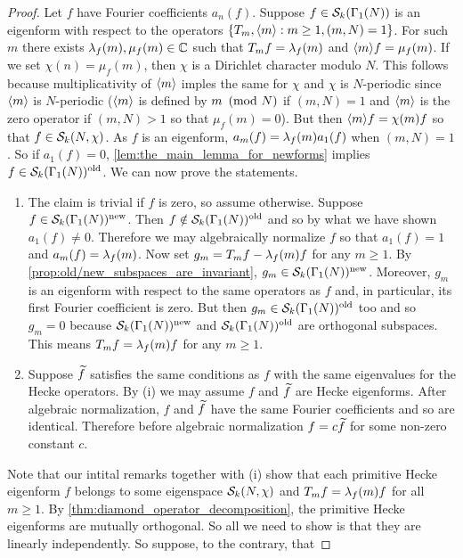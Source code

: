       \begin{proof}
        Let $f$ have Fourier coefficients $a_{n}(f)$. Suppose $f \in \mathcal{S}_{k}(\Gamma_{1}(N))$ is an eigenform with respect to the operators $\{T_{m},\langle m\rangle:m \ge 1, (m,N) = 1\}$. For such $m$ there exists $\lambda_{f}(m),\mu_{f}(m) \in \mathbb{C}$ such that $T_{m}f = \lambda_{f}(m)$ and $\langle m\rangle f = \mu_{f}(m)$. If we set $\chi(n) = \mu_{f}(m)$, then $\chi$ is a Dirichlet character modulo $N$. This follows because multiplicativity of $\langle m\rangle$ imples the same for $\chi$ and $\chi$ is $N$-periodic since $\langle m\rangle$ is $N$-periodic ($\langle m\rangle$ is defined by $m \ \left(\text{mod }N\right)$ if $(m,N) = 1$ and $\langle m\rangle$ is the zero operator if $(m,N) > 1$ so that $\mu_{f}(m) = 0$). But then $\langle m\rangle f = \chi(m)f$ so that $f \in \mathcal{S}_{k}(N,\chi)$. As $f$ is an eigenform, $a_{m}(f) = \lambda_{f}(m)a_{1}(f)$ when $(m,N) = 1$. So if $a_{1}(f) = 0$, \cref{lem:the_main_lemma_for_newforms} implies $f \in \mathcal{S}_{k}(\Gamma_{1}(N))^{\mathrm{old}}$. We can now prove the statements.
        \begin{enumerate}[label=(\roman*)]
          \item The claim is trivial if $f$ is zero, so assume otherwise. Suppose $f \in \mathcal{S}_{k}(\Gamma_{1}(N))^{\mathrm{new}}$. Then $f \notin \mathcal{S}_{k}(\Gamma_{1}(N))^{\mathrm{old}}$ and so by what we have shown $a_{1}(f) \neq 0$. Therefore we may algebraically normalize $f$ so that $a_{1}(f) = 1$ and $a_{m}(f) = \lambda_{f}(m)$. Now set $g_{m} = T_{m}f-\lambda_{f}(m)f$ for any $m \ge 1$. By \cref{prop:old/new_subspaces_are_invariant}, $g_{m} \in \mathcal{S}_{k}(\Gamma_{1}(N))^{\mathrm{new}}$. Moreover, $g_{m}$ is an eigenform with respect to the same operators as $f$ and, in particular, its first Fourier coefficient is zero. But then $g_{m} \in \mathcal{S}_{k}(\Gamma_{1}(N))^{\mathrm{old}}$ too and so $g_{m} = 0$ because $\mathcal{S}_{k}(\Gamma_{1}(N))^{\mathrm{new}}$ and $\mathcal{S}_{k}(\Gamma_{1}(N))^{\mathrm{old}}$ are orthogonal subspaces. This means $T_{m}f = \lambda_{f}(m)f$ for any $m \ge 1$.
          \item Suppose $\widetilde{f}$ satisfies the same conditions as $f$ with the same eigenvalues for the Hecke operators. By (i) we may assume $f$ and $\widetilde{f}$ are Hecke eigenforms. After algebraic normalization, $f$ and $\widetilde{f}$ have the same Fourier coefficients and so are identical. Therefore before algebraic normalization $f = c\widetilde{f}$ for some non-zero constant $c$.
        \end{enumerate}
        Note that our intital remarks together with (i) show that each primitive Hecke eigenform $f$ belongs to some eigenspace $\mathcal{S}_{k}(N,\chi)$ and $T_{m}f = \lambda_{f}(m)f$ for all $m \ge 1$. By \cref{thm:diamond_operator_decomposition}, the primitive Hecke eigenforms are mutually orthogonal. So all we need to show is that they are linearly independently. So suppose, to the contrary, that

\end{proof}
